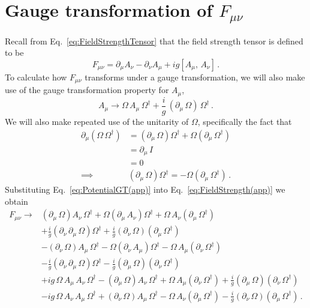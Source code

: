 \section{Gauge transformation of $F_{\mu\nu}$}\label{app:GTF}
Recall from Eq.~\eqref{eq:FieldStrengthTensor} that the field strength tensor is defined to be
%
\begin{equation}
F_{\mu\nu}=\partial_\mu A_\nu - \partial_\nu A_\mu + ig[A_\mu,\,A_\nu]\, .
\label{eq:FieldStrength(app)}
\end{equation}
%
To calculate how $F_{\mu\nu}$ transforms under a gauge transformation, we will also make use of the gauge transformation property for $A_\mu$,
%
\begin{equation}
A_\mu \rightarrow \Omega\,A_\mu\,\Omega^\dag + \frac{i}{g}\,(\partial_\mu\,\Omega)\,\Omega^\dag\, . 
\label{eq:PotentialGT(app)}
\end{equation}
%
We will also make repeated use of the unitarity of $\Omega$, specifically the fact that
%
\begin{align*}
\partial_\mu \left(\Omega\, \Omega^\dagger\right) &= \left(\partial_\mu\,\Omega\right)\Omega^\dagger + \Omega\left(\partial_\mu\, \Omega^\dagger\right)\\
&=\partial_\mu \, I\\
&= 0\\
\implies & \left(\partial_\mu\,\Omega\right)\Omega^\dagger = -\Omega\left(\partial_\mu\, \Omega^\dagger\right)\, .
\end{align*}
%
Substituting Eq.~\eqref{eq:PotentialGT(app)} into Eq.~\eqref{eq:FieldStrength(app)} we obtain
%
\begin{align*}
F_{\mu\nu} \rightarrow &\left(\partial_\mu \, \Omega\right)A_\nu \, \Omega^\dagger + \Omega\left(\partial_\mu\,A_\nu\right)\Omega^\dagger + \Omega \, A_\nu\left(\partial_\mu \, \Omega^\dagger\right)\\
& + \frac{i}{g}\left(\partial_\nu\,\partial_\mu\, \Omega\right)\Omega^\dagger + \frac{i}{g}\left(\partial_\nu\,\Omega\right)\left(\partial_\mu\,\Omega^\dagger\right)\\
& - \left(\partial_\nu \, \Omega\right)A_\mu \, \Omega^\dagger - \Omega\left(\partial_\nu\,A_\mu\right)\Omega^\dagger - \Omega \, A_\mu\left(\partial_\nu \, \Omega^\dagger\right)\\
& - \frac{i}{g}\left(\partial_\nu\,\partial_\mu\, \Omega\right)\Omega^\dagger - \frac{i}{g}\left(\partial_\mu\,\Omega\right)\left(\partial_\nu\,\Omega^\dagger\right)\\
& +ig \, \Omega \, A_\mu \, A_\nu \, \Omega^\dagger - \left(\partial_\mu \, \Omega\right)A_\nu \, \Omega^\dagger + \Omega\,A_\mu\left(\partial_\nu \, \Omega^\dagger\right) + \frac{i}{g}\left(\partial_\mu\,\Omega\right)\left(\partial_\nu\,\Omega^\dagger\right)\\
& -ig \, \Omega \, A_\nu \, A_\mu \, \Omega^\dagger + \left(\partial_\nu \, \Omega\right)A_\mu \, \Omega^\dagger - \Omega\,A_\nu\left(\partial_\mu \, \Omega^\dagger\right) - \frac{i}{g}\left(\partial_\nu\,\Omega\right)\left(\partial_\mu\,\Omega^\dagger\right)\, . 
\end{align*}
